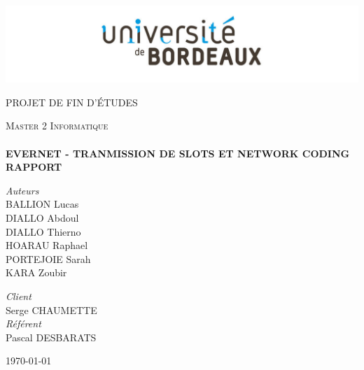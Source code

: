 \begin{titlepage}
\begin{center}

\includegraphics[width=0.8 \textwidth]{images/univ.jpg}\\[1cm]

{\scshape\LARGE PROJET DE FIN D'ÉTUDES\par}

	\vspace{2cm}

\textsc{\LARGE  Master 2 Informatique}\\[1.5cm]

\textsc{\Large }\\[0.5cm]
{\huge \bfseries EVERNET - TRANMISSION DE SLOTS ET NETWORK CODING\\
	\vspace{1.5cm}
RAPPORT \\[0.2cm] }

	\vspace{3cm}	
\begin{minipage}{0.4\textwidth}
\begin{flushleft} \large
\emph{Auteurs}\\
BALLION Lucas  \\
DIALLO Abdoul  \\ 
DIALLO Thierno   \\
HOARAU Raphael   \\
PORTEJOIE Sarah \\
KARA Zoubir  
\end{flushleft}
\end{minipage}
\begin{minipage}{0.4\textwidth}
\begin{flushright} \large
\emph{Client} \\
Serge  \textsc{CHAUMETTE}\\
\emph{Référent} \\
Pascal \textsc{DESBARATS}
\end{flushright}
\end{minipage}
	
\vfill

{\large \today}

\end{center}
\end{titlepage}